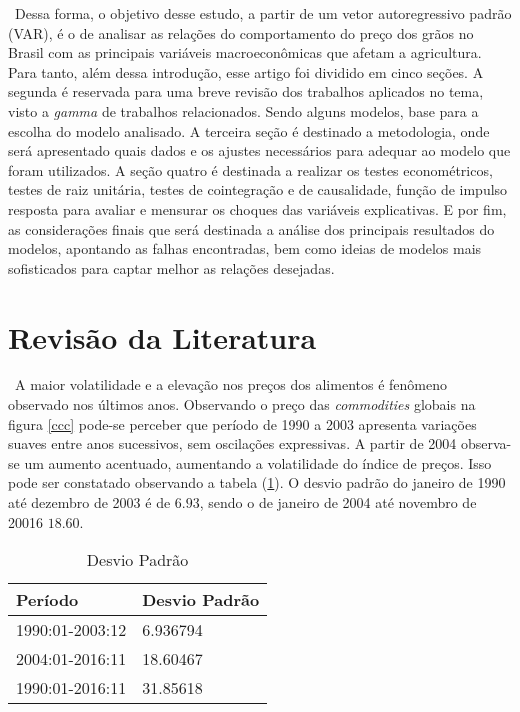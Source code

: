 \documentclass[a4paper,12pt,oneside,titlepage]{article}
\begin{document}
\ Dessa forma, o objetivo desse estudo, a partir de um vetor autoregressivo padrão (VAR), é o de analisar as relações do comportamento do preço dos grãos no Brasil com as principais variáveis macroeconômicas que afetam a agricultura. Para tanto, além dessa introdução, esse artigo foi dividido em cinco seções. A segunda é reservada para uma breve revisão dos trabalhos aplicados no tema, visto a \textit{gamma} de trabalhos relacionados. Sendo alguns modelos, base para a escolha do modelo analisado. A terceira seção é destinado a metodologia, onde será apresentado quais dados e os ajustes necessários para adequar ao modelo que foram utilizados. A seção quatro é destinada a realizar os testes econométricos, testes de raiz unitária, testes de cointegração e de causalidade, função de impulso resposta para avaliar e mensurar os choques das variáveis explicativas. E por fim, as considerações finais que será destinada a análise dos principais resultados do modelos, apontando as falhas encontradas, bem como ideias de modelos mais sofisticados para captar melhor as relações desejadas.      

\section{Revisão da Literatura}

\ A maior volatilidade e a elevação nos preços dos alimentos
é fenômeno observado nos últimos anos. Observando o preço das \textit{commodities} globais na figura \eqref{ccc} pode-se perceber que período de 1990 a 2003 apresenta variações suaves entre anos sucessivos, sem oscilações expressivas. A
partir de 2004 observa-se um aumento acentuado, aumentando a volatilidade do índice de preços. Isso pode ser constatado observando a tabela (\ref{dp1}). O desvio padrão do janeiro de 1990 até dezembro de 2003 é de $6.93$, sendo o de janeiro de 2004 até novembro de 20016 $18.60$.
\begin{table}[H]
	\caption{Desvio Padrão}
	\label{dp1}
	\begin{center}
		\begin{tabular}{ll}
			\hline
		Período	& Desvio Padrão   \\ 
			\hline
			1990:01-2003:12 &   6.936794  \\ 
			2004:01-2016:11& 18.60467     \\ 
			1990:01-2016:11& 31.85618   \\ 
		 		
			\hline
		\end{tabular}
	\end{center}
\end{table}          
\end{document}
